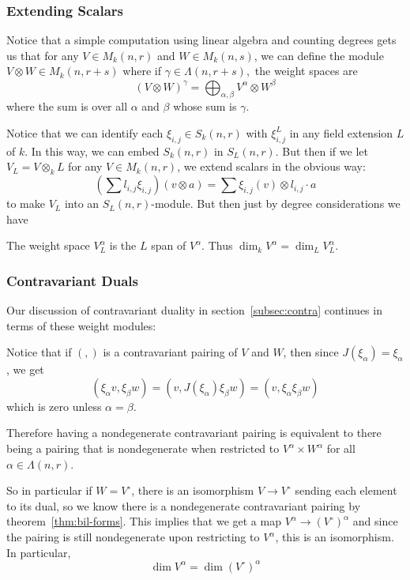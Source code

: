 \documentclass[12pt]{article}
\DeclareMathOperator{\1}{\mathbbm{1}}
\begin{document}
{\subsubsection{Extending Scalars}\label{subsubsec:extending}
Notice that a simple computation using linear algebra and counting degrees gets us that 
for any $V\in M_k(n,r)$ and $W\in M_k(n,s)$, we can define the module $V\otimes W\in M_k(n,r+s)$ 
where if $\gamma\in \Lambda(n,r+s),$ the weight spaces are
\[(V\otimes W)^\gamma=\bigoplus_{\alpha,\beta}V^\alpha\otimes W^\beta\]
where the sum is over all $\alpha$ and $\beta$ whose sum is $\gamma$.

Notice that we can identify each $\xi_{i,j}\in S_k(n,r)$ with $\xi_{i,j}^L$ in any field extension $L$ of $k$. 
In this way, we can embed $S_k(n,r)$ in $S_L(n,r)$. But then if we let $V_L=V\otimes_k L$ for any $V\in M_k(n,r)$, we extend scalars in the obvious way:
\[\left(\sum l_{i,j}\xi_{i,j}\right)(v\otimes a)=\sum \xi_{i,j}(v)\otimes l_{i,j}\cdot a\]
to make $V_L$ into an $S_L(n,r)$-module. But then just by degree considerations we have
\begin{prop}
	The weight space $V_L^\alpha$ is the $L$ span of $V^\alpha$. Thus $\dim_k V^\alpha=\dim_L V_L^\alpha$.
\end{prop}

\subsubsection{Contravariant Duals}

Our discussion of contravariant duality in section~\ref{subsec:contra} continues in terms of these weight modules:

Notice that if $(,)$ is a contravariant pairing of $V$ and $W$, then since $J(\xi_\alpha)=\xi_\alpha$, we get 
\[(\xi_\alpha v,\xi_\beta w)=(v,J(\xi_\alpha)\xi_\beta w)=(v,\xi_\alpha\xi_\beta w)\]
which is zero unless $\alpha=\beta$.

Therefore having a nondegenerate contravariant pairing is equivalent to there being a pairing that is nondegenerate 
when restricted to $V^\alpha\times W^\alpha$ for all $\alpha\in\Lambda(n,r)$.

So in particular if $W=V^\circ$, there is an isomorphism $V\to V^\circ$ sending each element to its dual,
so we know there is a nondegenerate contravariant pairing by theorem~\ref{thm:bil-forms}. 
This implies that we get a map $V^\alpha\to (V^\circ)^\alpha$ and since the pairing is still nondegenerate upon restricting to $V^\alpha$, this is an isomorphism. In particular,
\[\dim V^\alpha=\dim (V^\circ)^\alpha\]

}
\end{document}

